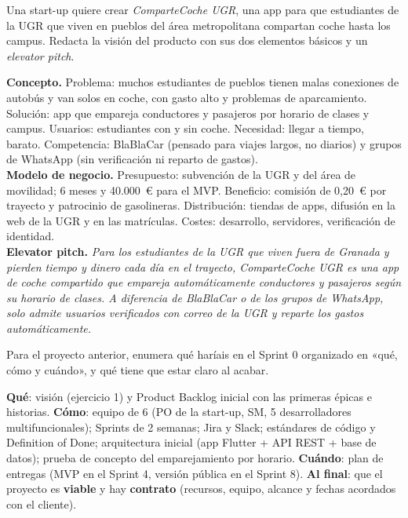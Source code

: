 \documentclass[11pt,a4paper,oneside,openany]{report}
\begin{document}
\begin{ejercicio}
Una start-up quiere crear \emph{ComparteCoche UGR}, una app para que estudiantes de la UGR que viven en pueblos del
área metropolitana compartan coche hasta los campus. Redacta la visión del producto con sus dos elementos básicos y
un \emph{elevator pitch}.
\end{ejercicio}
\textbf{Concepto.} Problema: muchos estudiantes de pueblos tienen malas conexiones de autobús y van solos en coche,
con gasto alto y problemas de aparcamiento. Solución: app que empareja conductores y pasajeros por horario de clases y
campus. Usuarios: estudiantes con y sin coche. Necesidad: llegar a tiempo, barato. Competencia: BlaBlaCar (pensado
para viajes largos, no diarios) y grupos de WhatsApp (sin verificación ni reparto de gastos).\\
\textbf{Modelo de negocio.} Presupuesto: subvención de la UGR y del área de movilidad; 6 meses y 40.000~\euro{} para el
MVP. Beneficio: comisión de 0,20~\euro{} por trayecto y patrocinio de gasolineras. Distribución: tiendas de apps,
difusión en la web de la UGR y en las matrículas. Costes: desarrollo, servidores, verificación de identidad.\\
\textbf{Elevator pitch.} \emph{Para los estudiantes de la UGR que viven fuera de Granada y pierden tiempo y dinero cada
día en el trayecto, ComparteCoche UGR es una app de coche compartido que empareja automáticamente conductores y
pasajeros según su horario de clases. A diferencia de BlaBlaCar o de los grupos de WhatsApp, solo admite usuarios
verificados con correo de la UGR y reparte los gastos automáticamente.}

\begin{ejercicio}[2. Sprint 0]
Para el proyecto anterior, enumera qué haríais en el Sprint 0 organizado en «qué, cómo y cuándo», y qué tiene que estar
claro al acabar.
\end{ejercicio}
\textbf{Qué}: visión (ejercicio 1) y Product Backlog inicial con las primeras épicas e historias. \textbf{Cómo}:
equipo de 6 (PO de la start-up, SM, 5 desarrolladores multifuncionales); Sprints de 2 semanas; Jira y Slack; estándares
de código y Definition of Done; arquitectura inicial (app Flutter + API REST + base de datos); prueba de concepto del
emparejamiento por horario. \textbf{Cuándo}: plan de entregas (MVP en el Sprint 4, versión pública en el Sprint 8).
\textbf{Al final}: que el proyecto es \textbf{viable} y hay \textbf{contrato} (recursos, equipo, alcance y fechas
acordados con el cliente).
\end{document}
